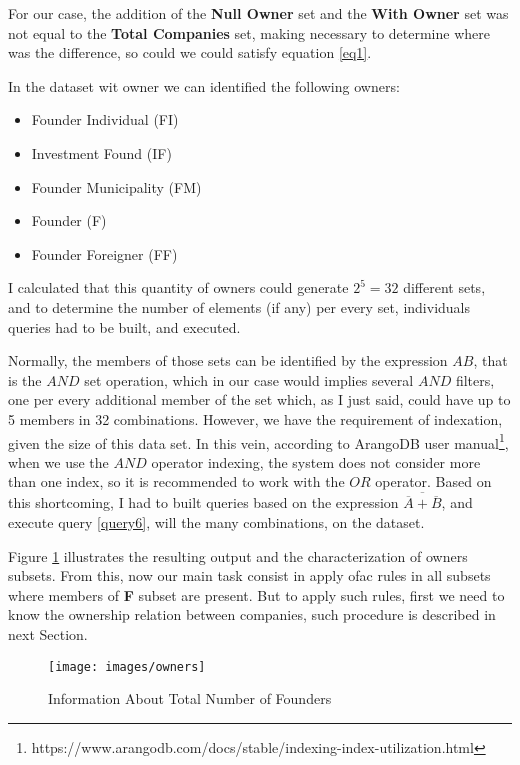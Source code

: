 \begin{spacing}{1.5}
	For our case, the addition of the \textbf{Null Owner} set and the \textbf{With Owner} set was not equal to the \textbf{Total Companies} set, making necessary to determine where was the difference, so could we could satisfy equation \ref{eq1}. 
	
	In the dataset wit owner we can identified the following owners:
	
	\begin{itemize}
		\item Founder Individual (FI)
		\item Investment Found (IF)
		\item Founder Municipality (FM)
		\item Founder (F)
		\item Founder Foreigner (FF)
	\end{itemize}
	
	I calculated that this quantity of owners could generate $2^5 = 32$ different sets, and to determine the number of elements (if any) per every set, individuals queries had to be built, and executed. 
	
	Normally, the members of those sets can be identified by the expression $AB$, that is the $AND$ set operation, which in our case would implies several $AND$ filters, one per every additional member of the set which, as I just said, could have up to 5 members in 32 combinations. However, we have the requirement of indexation, given the size of this data set. In this vein, according to ArangoDB user manual\footnote{https://www.arangodb.com/docs/stable/indexing-index-utilization.html}, when we use the $AND$ operator indexing, the system does not consider more than one index, so it is recommended to work with the $OR$ operator. Based on this shortcoming, I had to built queries based on the expression  $\overline{\overline{A}+\overline{B}}$, and execute query \ref{query6}, will the many combinations, on the dataset. 
	
	Figure \ref{figure2} illustrates the resulting output and the characterization of owners subsets. From this, now our main task consist in apply \gls{ofac} rules in all subsets where members of \textbf{F} subset are present. But to apply such rules, first we need to know the ownership relation between companies, such procedure is described in next Section.  
		
	\begin{figure}
		\centering
		\texttt{[image: images/owners]}
		\caption{Information About Total Number of Founders}\label{figure2}
	\end{figure}
	

\end{spacing}
